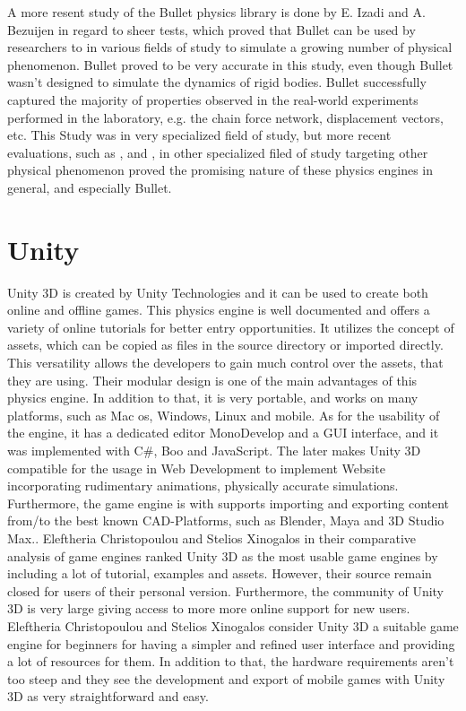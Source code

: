 \documentclass[
	12pt, 
	a4paper, 
]{article}
\begin{document}
	A more resent study of the Bullet physics library is done by E. Izadi and A. Bezuijen in regard to sheer tests, which proved that Bullet can be used by researchers to in various fields of study to simulate a growing number of physical phenomenon. Bullet proved to be very accurate in this study, even though Bullet wasn't designed to simulate the dynamics of rigid bodies. Bullet successfully captured the majority of properties observed in the real-world experiments performed in the laboratory, e.g. the chain force network, displacement vectors, etc\cite{izadi2018simulating}. This Study was in very specialized field of study, but more recent evaluations, such as \cite{chung2016predictable}, \cite{fazioli2016implementation} and \cite{silva2012comparative}, in other specialized filed of study targeting other physical phenomenon proved the promising nature of these physics engines in general, and especially Bullet.
	\section{Unity}
	Unity 3D is created by Unity Technologies and it can be used to create both online and offline games. This physics engine is well documented and offers a variety of online tutorials for better entry opportunities. It utilizes the concept of assets, which can be copied as files in the source directory or imported directly. This versatility allows the developers to gain much control over the assets, that they are using. Their modular design is one of the main advantages of this physics engine. In addition to that, it is very portable, and works on many platforms, such as Mac os, Windows, Linux and mobile.\cite{mat2014using}\newline
	As for the usability of the engine, it has a dedicated editor MonoDevelop and a GUI interface, and it was implemented with C\#, Boo and JavaScript.\cite{christopoulou2017overview} The later makes Unity 3D compatible for the usage in Web Development to implement Website incorporating rudimentary animations, physically accurate simulations. Furthermore, the game engine is with supports importing and exporting content from/to the best known CAD-Platforms, such as Blender, Maya and 3D Studio Max.\cite{christopoulou2017overview}.\newline
	Eleftheria Christopoulou and Stelios Xinogalos in their comparative analysis of game engines ranked Unity 3D as the most usable game engines by including a lot of tutorial, examples and assets. However, their source remain closed for users of their personal version. Furthermore, the community of Unity 3D is very large giving access to more more online support for new users\cite{christopoulou2017overview}. Eleftheria Christopoulou and Stelios Xinogalos consider Unity 3D a suitable game engine for beginners for having a simpler and refined user interface and providing a lot of resources for them. In addition to that, the hardware requirements aren't too steep and they see the development and export of mobile games with Unity 3D as very straightforward and easy\cite{christopoulou2017overview}.
\end{document}

